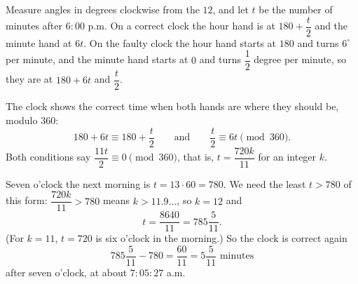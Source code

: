 Measure angles in degrees clockwise from the $12$, and let $t$ be the number of minutes after $6{:}00$ p.m. On a correct clock the hour hand is at $180+\dfrac {t}{2}$ and the minute hand at $6t$. On the faulty clock the hour hand starts at $180$ and turns $6^\circ$ per minute, and the minute hand starts at $0$ and turns $\dfrac{1}{2}$ degree per minute, so they are at $180+6t$ and $\dfrac {t}{2}$.

The clock shows the correct time when both hands are where they should be, modulo $360$:
\[
180+6t\equiv180+\dfrac {t}{2}\qquad\text{and}\qquad\dfrac {t}{2}\equiv6t\pmod{360}.
\]
Both conditions say $\dfrac{11t}{2}\equiv0\pmod{360}$, that is, $t=\dfrac{720k}{11}$ for an integer $k$.

Seven o'clock the next morning is $t=13\cdot60=780$. We need the least $t>780$ of this form: $\dfrac{720k}{11}>780$ means $k>11.9\ldots$, so $k=12$ and
\[
t=\dfrac{8640}{11}=785\dfrac{5}{11}.
\]
(For $k=11$, $t=720$ is six o'clock in the morning.) So the clock is correct again
\[
785\dfrac{5}{11}-780=\boxed{\dfrac{60}{11}=5\dfrac{5}{11}\text{ minutes}}
\]
after seven o'clock, at about $7{:}05{:}27$ a.m.
